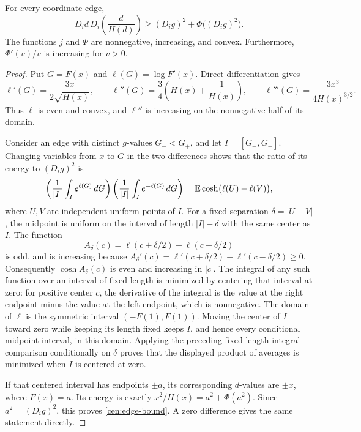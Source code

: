 \begin{lemma}\label{cen:edge}
For every coordinate edge,
\begin{equation}\label{cen:edge-bound}
 D_i d\,D_i\!\left(\frac d{H(d)}\right)
 \ge (D_i g)^2+\Phi\bigl((D_i g)^2\bigr).
\end{equation}
The functions $j$ and $\Phi$ are nonnegative, increasing, and convex.
Furthermore, $\Phi'(v)/v$ is increasing for $v>0$.
\end{lemma}

\begin{proof}
Put $G=F(x)$ and $\ell(G)=\log F'(x)$.  Direct differentiation gives
\begin{equation}\label{cen:ell}
 \ell'(G)=\frac{3x}{2\sqrt{H(x)}},\qquad
 \ell''(G)=\frac34\left(H(x)+\frac1{H(x)}\right),\qquad
 \ell'''(G)=\frac{3x^3}{4H(x)^{3/2}}.
\end{equation}
Thus $\ell$ is even and convex, and $\ell''$ is increasing on the
nonnegative half of its domain.

Consider an edge with distinct $g$-values $G_-<G_+$, and let
$I=[G_-,G_+]$.  Changing variables from $x$ to $G$ in the two differences
shows that the ratio of its energy to $(D_i g)^2$ is
\[
 \left(\frac1{|I|}\int_I e^{\ell(G)}\,dG\right)
 \left(\frac1{|I|}\int_I e^{-\ell(G)}\,dG\right)
 =\mathbb E\cosh\bigl(\ell(U)-\ell(V)\bigr),
\]
where $U,V$ are independent uniform points of $I$.  For a fixed separation
$\delta=|U-V|$, the midpoint is uniform on the interval of length
$|I|-\delta$ with the same center as $I$.  The function
\[
 A_\delta(c)=\ell(c+\delta/2)-\ell(c-\delta/2)
\]
is odd, and is increasing because
$A_\delta'(c)=\ell'(c+\delta/2)-\ell'(c-\delta/2)\ge0$.
Consequently $\cosh A_\delta(c)$ is even and increasing in $|c|$.
The integral of any such function over an interval of fixed length is
minimized by centering that interval at zero: for positive center $c$,
the derivative of the integral is the value at the right endpoint minus
the value at the left endpoint, which is nonnegative.  The domain of $\ell$ is the symmetric interval $(-F(1),F(1))$.
Moving the center of $I$ toward zero while keeping its length fixed
keeps $I$, and hence every conditional midpoint interval, in this domain.
Applying the preceding fixed-length integral comparison conditionally
on $\delta$ proves that the displayed product of averages is minimized
when $I$ is centered at zero.

If that centered interval has endpoints $\pm a$, its corresponding
$d$-values are $\pm x$, where $F(x)=a$.  Its energy is exactly
$x^2/H(x)=a^2+\Phi(a^2)$.  Since $a^2=(D_i g)^2$, this proves
\eqref{cen:edge-bound}.  A zero difference gives the same statement
directly.


\end{proof}
